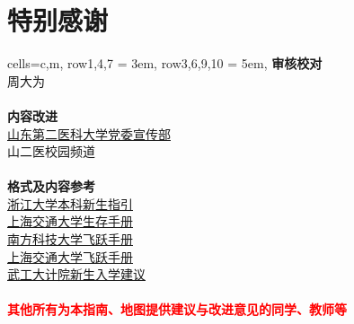 \chapter*{特别感谢}
\begin{tblr}[
    long,
    theme=no-caption
    ]{
    cells={c,m},
    row{1,4,7} = {3em},
    row{3,6,9,10} = {5em},}
    {\large\textbf{审核校对}}                                                       \\
    {周大为}                                                                       \\
    \\
    {\large\textbf{内容改进}}                                                       \\
    {\uline{\href{https://xchb.sdsmu.edu.cn/}{山东第二医科大学党委宣传部}}                   \\
    山二医校园频道}                                                                    \\
    \\
    {\large\textbf{格式及内容参考}}                                                    \\
    {\uline{\href{https://zjuers.com/welcome/}{浙江大学本科新生指引}}                     \\
    \uline{\href{https://survivesjtu.gitbook.io/survivesjtumanual}{上海交通大学生存手册}} \\
    \uline{\href{https://sustech-application.com/}{南方科技大学飞跃手册}}                 \\
    \uline{\href{https://survivesjtu.github.io/SJTU-Application/}{上海交通大学飞跃手册}}  \\
    \uline{\href{https://gitee.com/hanyaner/witjij}{武工大计院新生入学建议}}}              \\
    \\
    {\large\textbf{\textcolor{red}{其他所有为本指南、地图提供建议与改进意见的同学、教师等}}}
\end{tblr}

